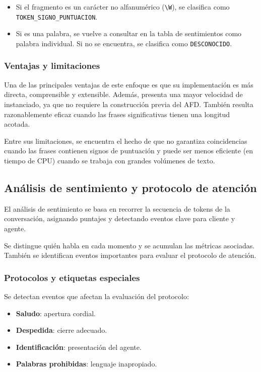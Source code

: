 \begin{itemize}
	\item Si el fragmento es un carácter no alfanumérico (\texttt{\textbackslash W}), se
	      clasifica como \texttt{TOKEN\_SIGNO\_PUNTUACION}.

	\item Si es una palabra, se vuelve a consultar en la tabla de sentimientos como palabra
	      individual. Si no se encuentra, se clasifica como \texttt{DESCONOCIDO}.
\end{itemize}

\subsubsection{Ventajas y limitaciones}
Una de las principales ventajas de este enfoque es que su implementación es más directa,
comprensible y extensible. Además, presenta una mayor velocidad de instanciado, ya que no
requiere la construcción previa del AFD. También resulta razonablemente eficaz cuando las
frases significativas tienen una longitud acotada.

Entre sus limitaciones, se encuentra el hecho de que no garantiza coincidencias cuando las
frases contienen signos de puntuación y puede ser menos eficiente (en tiempo de CPU) cuando se
trabaja con grandes volúmenes de texto.

\subsection{Análisis de sentimiento y protocolo de atención}
El análisis de sentimiento se basa en recorrer la secuencia de tokens de la conversación,
asignando puntajes y detectando eventos clave para cliente y agente.

Se distingue quién habla en cada momento y se acumulan las métricas asociadas. También se
identifican eventos importantes para evaluar el protocolo de atención.

\subsubsection{Protocolos y etiquetas especiales}
Se detectan eventos que afectan la evaluación del protocolo:

\begin{itemize}
	\item \textbf{Saludo}: apertura cordial.
	\item \textbf{Despedida}: cierre adecuado.
	\item \textbf{Identificación}: presentación del agente.
	\item \textbf{Palabras prohibidas}: lenguaje inapropiado.
\end{itemize}

